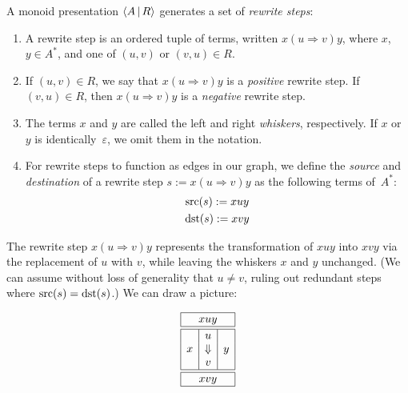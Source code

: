 \documentclass[../generics]{subfiles}
\begin{document}
\begin{definition}\label{rewrite step def} A monoid presentation $\langle A\,|\,R\rangle$ generates a set of \emph{rewrite steps}:
\begin{enumerate}
\item A rewrite step is an ordered tuple of terms, written \index{$\Rightarrow$}$x(u\Rightarrow v)y$, where $x$, $y\in A^*$, and one of $(u,v)$ or $(v,u)\in R$.
\item If $(u,v)\in R$, we say that $x(u\Rightarrow v)y$ is a \emph{positive} rewrite step. If $(v,u)\in R$, then $x(u\Rightarrow v)y$ is a \emph{negative} rewrite step.
\item The terms $x$ and $y$ are called the left and right \emph{whiskers}, respectively. If $x$ or $y$ is identically~$\varepsilon$, we omit them in the notation.
\item For rewrite steps to function as edges in our graph, we define the \emph{source} and \emph{destination} of a rewrite step $s:= x(u\Rightarrow v)y$ as the following terms of~$A^*$:
\begin{gather*}
\operatorname{src}(s) := xuy\\
\operatorname{dst}(s) := xvy
\end{gather*}
\end{enumerate}
\end{definition}

The rewrite step $x(u\Rightarrow v)y$ represents the transformation of $xuy$ into $xvy$ via the replacement of $u$ with $v$, while leaving the whiskers $x$ and $y$ unchanged. (We can assume without loss of generality that $u\neq v$, ruling out redundant steps where $\operatorname{src}(s)=\operatorname{dst}(s)$.) We can draw a picture:
\begin{ceqn}
\[
\begin{array}{|c|c|c|}
\hline
\multicolumn{3}{|c|}{xuy}\\
\hline
\hline
&u&\\
x&\Downarrow&y\\
&v&\\
\hline
\hline
\multicolumn{3}{|c|}{xvy}\\
\hline
\end{array}
\]
\end{ceqn}
\end{document}
